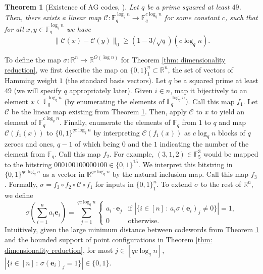 \documentclass{article}\providecommand{\DeclareRedundantLanguages}[2]{}\usepackage[a4paper,margin=20mm]{geometry}
\newtheorem{theorem}{Theorem}\newtheorem{lemma}[theorem]{Lemma}\newtheorem{proposition}[theorem]{Proposition}\newtheorem{corollary}[theorem]{Corollary}\newtheorem{definition}[theorem]{Definition}\newtheorem{claim}[theorem]{Claim}\newtheorem{remark}[theorem]{Remark}\newtheorem{observation}[theorem]{Observation}\newtheorem{conjecture}[theorem]{Conjecture}\newtheorem{example}[theorem]{Example}
\newcommand{\R}{\mathbb{R}}
\newcommand{\1}{\textbf{1}}
\newcommand{\e}{\mathbf{e}}
\begin{document}
\begin{theorem}[Existence of AG codes,  \cite{Garcia_Stichtenoth_1996, Shum_Aleshnikov_Kumar_Stichtenoth_Deolalikar_2001}] \label{thm: existence of AG codes}
Let $q$ be a prime squared at least $49$. Then, there exists a linear map $\mathcal{C} : \mathbb{F}_q^{\log_q n} \to \mathbb{F}_q^{c \log_q n}$ for some constant $c$, such that for all $x, y \in \mathbb{F}_q^{\log_q n}$ we have
\[
\| \mathcal{C}(x) - \mathcal{C}(y)\|_0 \geq (1 - 3/\sqrt{q})(c \log_q n).
\]  
\end{theorem}
%
To define the map $\sigma: \R^n \to \R^{O(\log n)}$ for Theorem \ref{thm: dimensionality reduction}, we first describe the map on $\{0,1\}^n_1 \subset \R^n$, the set of vectors of Hamming weight $1$ (the standard basis vectors).  Let $q$ be a squared prime at least $49$ (we will specify $q$ appropriately later). Given $i \in n$, map it bijectively to an element $x \in \mathbb{F}_q^{\log_q n}$ (by enumerating the elements of $\mathbb{F}_q^{\log _q n})$. Call this map $f_1$. Let $\mathcal{C}$ be the linear map existing from Theorem \ref{thm: existence of AG codes}. Then, apply $\mathcal{C}$ to $x$ to yield an element of  $\mathbb{F}_q^{c \log_q n}$. Finally, enumerate the elements of $\mathbb{F}_q$ from $1$ to $q$ and map $\mathcal{C}(f_1(x))$ to $\{0,1\}^{qc \log_q n}$ by interpreting  $\mathcal{C}(f_1(x))$ as $c \log_q n$ blocks of $q$ zeroes and ones, $q-1$ of which being $0$ and the $1$ indicating the number of the element from $\mathbb{F}_q$. Call this map $f_2$. For example, $(3,1,2) \in \mathbb{F}_5^3$ would be mapped to the bitstring $000100100000100 \in \{0,1\}^{15}$. We interpret this bitstring in $\{0,1\}^{qc \log_q n}$ as a vector in $\mathbb{R}^{qc \log_q n}$ by the natural inclusion map. Call this map $f_3$. Formally, $\sigma = f_3 \circ f_2 \circ \mathcal{C} \circ f_1$ for inputs in $\{0,1\}^n_1$. 
%
%
To extend $\sigma$ to the rest of $\R^n$, we define
\[
\sigma \left(\sum_{i = 1}^n a_i \e_i \right) = \sum_{j = 1}^{qc \log_q n} \begin{cases}
a_i \cdot \e_j &\text{if } |\{i \in [n] \,:\, a_i \sigma(\e_i)_j \neq 0\}| = 1, \\
0 &\text{otherwise}.
\end{cases}
\]
 Intuitively, given the large minimum distance between codewords from Theorem \ref{thm: existence of AG codes} and the bounded support of point configurations in Theorem \ref{thm: dimensionality reduction}, for most $j \in [qc \log_q n]$, $|\{i \in [n] \,:\, \sigma(\e_i)_j = 1\}| \in \{0,1\}$. 
\end{document}
